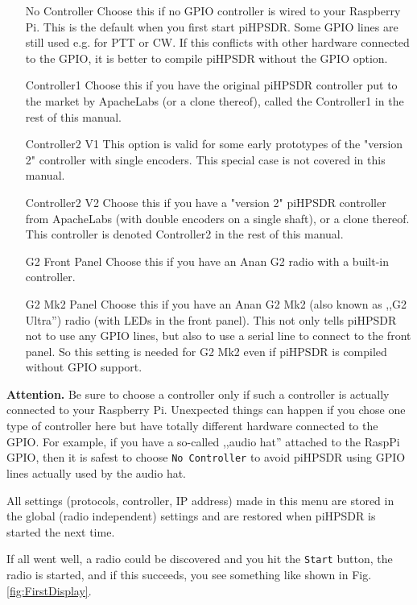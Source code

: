 \documentclass[12pt]{book}
\def\rett#1{\texttt{\color{red}#1}}
\def\pH{pi\-HPSDR\xspace}
\begin{document}
\begin{itemize}[font=\texttt, left=80pt]
\item[No Controller]{Choose this if no GPIO controller is wired to your Raspberry Pi. This is the default
when you first start \pH. Some GPIO lines are still used e.g. for PTT or CW. If this conflicts with other
hardware connected to the GPIO, it is better to compile \pH without the GPIO option.}
\item[Controller1]{Choose this if you have the original \pH controller put to the market by ApacheLabs
(or a clone thereof), called the Controller1 in the rest
of this manual.}
\item[Controller2 V1]{This option is valid for some early prototypes of the "version 2" controller with
single encoders. This special case is not covered in this manual.}
\item[Controller2 V2]{Choose this if you have a "version 2" \pH controller from ApacheLabs (with double encoders
on a single shaft), or a clone thereof.
This controller is denoted Controller2 in the rest of this manual.}
\item[G2 Front Panel]{Choose this if you have an Anan G2 radio with a built-in controller.}
\item[G2 Mk2 Panel]{Choose this if you have an Anan G2 Mk2 (also known as ,,G2 Ultra'') 
radio (with LEDs in the front panel).
This not only tells \pH not to use any GPIO lines, but also to use a serial line to connect to the front panel.
So this setting is needed for G2 Mk2 even if \pH is compiled without GPIO support.}
\end{itemize}

\textbf{Attention.} Be sure to choose a controller only if such a controller is actually connected to your
Raspberry Pi. Unexpected things can happen if you chose one type of controller here but have totally different
hardware connected to the GPIO. For example, if you have a so-called ,,audio hat'' attached to the RaspPi
GPIO, then it is safest to choose \texttt{No Controller} to avoid \pH using GPIO lines actually used
by the audio hat.

All settings (protocols, controller, IP address) made in this menu are stored in the global (radio
independent) settings
and are restored when \pH is started the next time.

If all went well, a radio could be discovered and you hit the \rett{Start} button, the radio is started, and
if this succeeds, you see something like shown in Fig. \ref{fig:FirstDisplay}.
\end{document}
